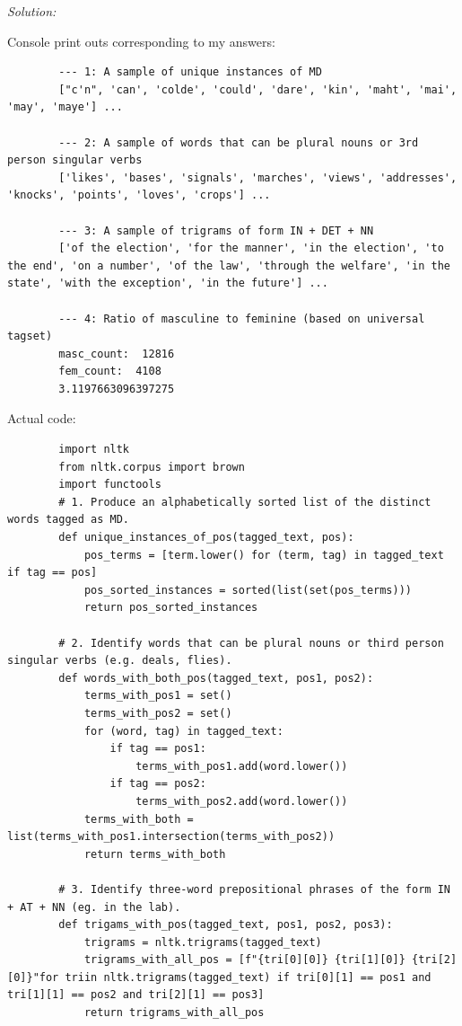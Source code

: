 \documentclass[11pt]{article}
\newenvironment{solution}{
	\vspace{10px}\noindent\emph{Solution:}
}{
	\vspace{10px}
}
\begin{document}
\begin{solution}
	
	Console print outs corresponding to my answers: 
	
	\begin{lstlisting}
		--- 1: A sample of unique instances of MD
		["c'n", 'can', 'colde', 'could', 'dare', 'kin', 'maht', 'mai', 'may', 'maye'] ...
		
		--- 2: A sample of words that can be plural nouns or 3rd person singular verbs
		['likes', 'bases', 'signals', 'marches', 'views', 'addresses', 'knocks', 'points', 'loves', 'crops'] ...
		
		--- 3: A sample of trigrams of form IN + DET + NN
		['of the election', 'for the manner', 'in the election', 'to the end', 'on a number', 'of the law', 'through the welfare', 'in the state', 'with the exception', 'in the future'] ...
		
		--- 4: Ratio of masculine to feminine (based on universal tagset)
		masc_count:  12816
		fem_count:  4108
		3.1197663096397275
	\end{lstlisting}
	
	Actual code: 

	\begin{lstlisting}
		import nltk 
		from nltk.corpus import brown
		import functools
		# 1. Produce an alphabetically sorted list of the distinct words tagged as MD.
		def unique_instances_of_pos(tagged_text, pos): 
			pos_terms = [term.lower() for (term, tag) in tagged_text if tag == pos]
			pos_sorted_instances = sorted(list(set(pos_terms)))
			return pos_sorted_instances
		
		# 2. Identify words that can be plural nouns or third person singular verbs (e.g. deals, flies).
		def words_with_both_pos(tagged_text, pos1, pos2): 
			terms_with_pos1 = set()
			terms_with_pos2 = set()
			for (word, tag) in tagged_text: 
				if tag == pos1: 
					terms_with_pos1.add(word.lower())
				if tag == pos2: 
					terms_with_pos2.add(word.lower())
			terms_with_both = list(terms_with_pos1.intersection(terms_with_pos2))
			return terms_with_both
		
		# 3. Identify three-word prepositional phrases of the form IN + AT + NN (eg. in the lab).
		def trigams_with_pos(tagged_text, pos1, pos2, pos3): 
			trigrams = nltk.trigrams(tagged_text)
			trigrams_with_all_pos = [f"{tri[0][0]} {tri[1][0]} {tri[2][0]}"for triin nltk.trigrams(tagged_text) if tri[0][1] == pos1 and tri[1][1] == pos2 and tri[2][1] == pos3]
			return trigrams_with_all_pos
		

\end{lstlisting}
\end{solution}
\end{document}

